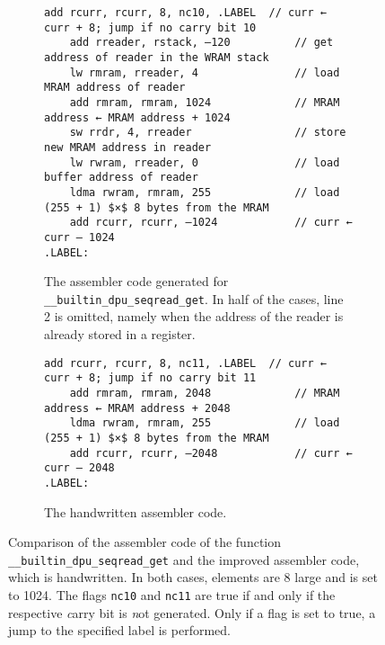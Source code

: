 \begin{figure}[t]
	\begin{subfigure}{\textwidth}
		\begin{lstlisting}[language={[DPU]Assembler}, mathescape, keepspaces]
	add rcurr, rcurr, 8, nc10, .LABEL  // curr ← curr + 8; jump if no carry bit 10
	add rreader, rstack, –120          // get address of reader in the WRAM stack
	lw rmram, rreader, 4               // load MRAM address of reader
	add rmram, rmram, 1024             // MRAM address ← MRAM address + 1024
	sw rrdr, 4, rreader                // store new MRAM address in reader
	lw rwram, rreader, 0               // load buffer address of reader
	ldma rwram, rmram, 255             // load (255 + 1) $×$ 8 bytes from the MRAM
	add rcurr, rcurr, –1024            // curr ← curr – 1024
.LABEL:\end{lstlisting}
		\caption{
			The assembler code generated for \lstinline|__builtin_dpu_seqread_get|.
			In half of the cases, line 2 is omitted, namely when the address of the reader is already stored in a register.
		}
		\label{fig:mram:assembler:auto}
	\end{subfigure}

	\smallskip

	\begin{subfigure}{\textwidth}
		\begin{lstlisting}[language={[DPU]Assembler}, mathescape, keepspaces]
	add rcurr, rcurr, 8, nc11, .LABEL  // curr ← curr + 8; jump if no carry bit 11
	add rmram, rmram, 2048             // MRAM address ← MRAM address + 2048
	ldma rwram, rmram, 255             // load (255 + 1) $×$ 8 bytes from the MRAM
	add rcurr, rcurr, –2048            // curr ← curr – 2048
.LABEL:\end{lstlisting}
		\caption{
			The handwritten assembler code.
		}
		\label{fig:mram:assembler:manual}
	\end{subfigure}
	\caption{
		Comparison of the assembler code of the function \lstinline|__builtin_dpu_seqread_get| and the improved assembler code, which is handwritten.
		In both cases, elements are \qty{8}{\byte} large and \seqreadcachesize{} is set to 1024.
		The flags \lstinline|nc10| and \lstinline|nc11| are true if and only if the respective \emph{c}arry bit is \emph{n}ot generated.
		Only if a flag is set to true, a jump to the specified label is performed.
	}
	\label{fig:mram:assembler}
\end{figure}

